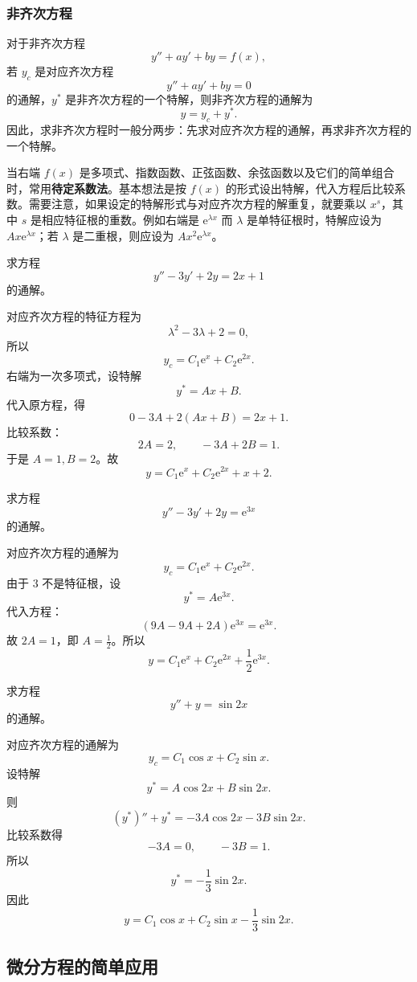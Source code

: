 \documentclass[fontset=fandol]{ctexart}
\newcommand{\ee}{\mathrm{e}}
\begin{document}
\subsubsection*{非齐次方程}

对于非齐次方程
\[
y''+ay'+by=f(x),
\]
若 $y_c$ 是对应齐次方程
\[
y''+ay'+by=0
\]
的通解，$y^*$ 是非齐次方程的一个特解，则非齐次方程的通解为
\[
y=y_c+y^*.
\]
因此，求非齐次方程时一般分两步：先求对应齐次方程的通解，再求非齐次方程的一个特解。

当右端 $f(x)$ 是多项式、指数函数、正弦函数、余弦函数以及它们的简单组合时，常用\textbf{待定系数法}。基本想法是按 $f(x)$ 的形式设出特解，代入方程后比较系数。需要注意，如果设定的特解形式与对应齐次方程的解重复，就要乘以 $x^s$，其中 $s$ 是相应特征根的重数。例如右端是 $\ee^{\lambda x}$ 而 $\lambda$ 是单特征根时，特解应设为 $Ax\ee^{\lambda x}$；若 $\lambda$ 是二重根，则应设为 $Ax^2\ee^{\lambda x}$。

\begin{example}[右端为多项式]
求方程
\[
y''-3y'+2y=2x+1
\]
的通解。

对应齐次方程的特征方程为
\[
\lambda^2-3\lambda+2=0,
\]
所以
\[
y_c=C_1\ee^x+C_2\ee^{2x}.
\]
右端为一次多项式，设特解
\[
y^*=Ax+B.
\]
代入原方程，得
\[
0-3A+2(Ax+B)=2x+1.
\]
比较系数：
\[
2A=2,\qquad -3A+2B=1.
\]
于是 $A=1,B=2$。故
\[
y=C_1\ee^x+C_2\ee^{2x}+x+2.
\]
\end{example}

\begin{example}[右端为指数函数]
求方程
\[
y''-3y'+2y=\ee^{3x}
\]
的通解。

对应齐次方程的通解为
\[
y_c=C_1\ee^x+C_2\ee^{2x}.
\]
由于 $3$ 不是特征根，设
\[
y^*=A\ee^{3x}.
\]
代入方程：
\[
(9A-9A+2A)\ee^{3x}=\ee^{3x}.
\]
故 $2A=1$，即 $A=\frac12$。所以
\[
y=C_1\ee^x+C_2\ee^{2x}+\frac12\ee^{3x}.
\]
\end{example}

\begin{example}[右端为三角函数]
求方程
\[
y''+y=\sin 2x
\]
的通解。

对应齐次方程的通解为
\[
y_c=C_1\cos x+C_2\sin x.
\]
设特解
\[
y^*=A\cos2x+B\sin2x.
\]
则
\[
(y^*)''+y^*=-3A\cos2x-3B\sin2x.
\]
比较系数得
\[
-3A=0,\qquad -3B=1.
\]
所以
\[
y^*=-\frac13\sin2x.
\]
因此
\[
y=C_1\cos x+C_2\sin x-\frac13\sin2x.
\]
\end{example}

\subsection{微分方程的简单应用}
\end{document}
